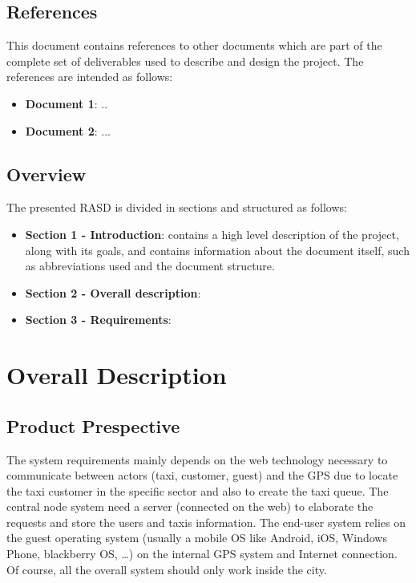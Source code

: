 \documentclass[english]{article}
\begin{document}
\subsection{References}

This document contains references to other documents which are part
of the complete set of deliverables used to describe and design the
project. The references are intended as follows: 
\begin{itemize}
\item \textbf{Document 1}: ..
\item \textbf{Document 2}: ...
\end{itemize}

\subsection{Overview}

The presented RASD is divided in sections and structured as follows: 
\begin{itemize}
\item \textbf{Section 1 - Introduction}: contains a high level description
of the project, along with its goals, and contains information about
the document itself, such as abbreviations used and the document structure. 
\item \textbf{Section 2 - Overall description}: 
\item \textbf{Section 3 - Requirements}:\end{itemize}

\section{Overall Description}

\subsection{Product Prespective}

The system requirements mainly depends on the web technology necessary to communicate between actors 
(taxi, customer, guest) and the GPS due to locate the taxi customer in the specific sector and also to create the taxi queue. 
The central node system need a server (connected on the web) to elaborate the requests and store the users and taxis information. 
The end-user system relies on the guest operating system (usually a mobile OS like Android, iOS, Windows Phone, blackberry OS, \ldots) 
on the internal GPS system and Internet connection. Of course, all the overall system should only work inside the city.
\end{document}
